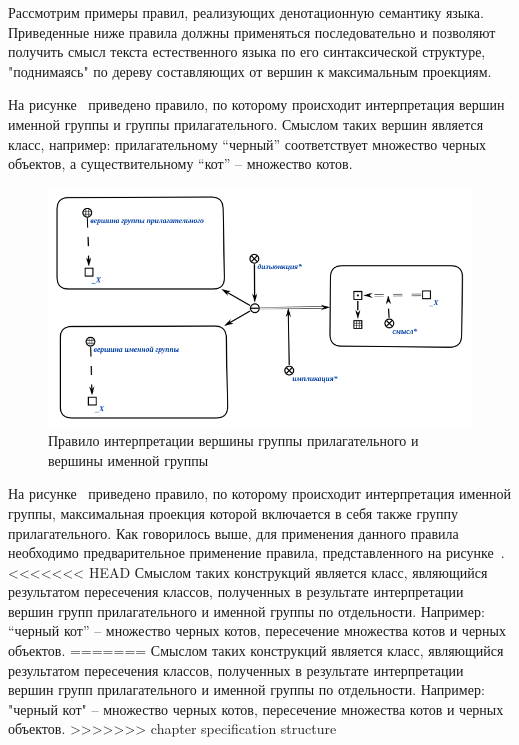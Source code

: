 Рассмотрим примеры правил, реализующих денотационную семантику языка.
Приведенные ниже правила должны применяться последовательно и позволяют получить смысл текста естественного языка по его синтаксической структуре, "поднимаясь"{} по дереву составляющих от вершин к максимальным проекциям.

На рисунке~\textit{} приведено правило, по которому происходит интерпретация вершин именной группы и группы прилагательного.
Смыслом таких вершин является класс, например: прилагательному ``черный'' соответствует множество черных объектов, а существительному ``кот'' -- множество котов.

\begin{figure}[H]
    \centering
    \includegraphics[scale=0.8]{images/part2/chapter_lang/d_sem_1}
    \caption{Правило интерпретации вершины группы прилагательного и вершины именной группы}
    \label{fig:d_sem_1}
\end{figure}

На рисунке~\textit{} приведено правило, по которому происходит интерпретация именной группы, максимальная проекция которой включается в себя также группу прилагательного.
Как говорилось выше, для применения данного правила необходимо предварительное применение правила, представленного на рисунке~\textit{}.
<<<<<<< HEAD
Смыслом таких конструкций является класс, являющийся результатом пересечения классов, полученных в результате интерпретации вершин групп прилагательного и именной группы по отдельности. Например: ``черный кот''{} -- множество черных котов, пересечение множества котов и черных объектов. %
=======
Смыслом таких конструкций является класс, являющийся результатом пересечения классов, полученных в результате интерпретации вершин групп прилагательного и именной группы по отдельности.
Например: "черный кот"{} -- множество черных котов, пересечение множества котов и черных объектов. %
>>>>>>> chapter specification structure

